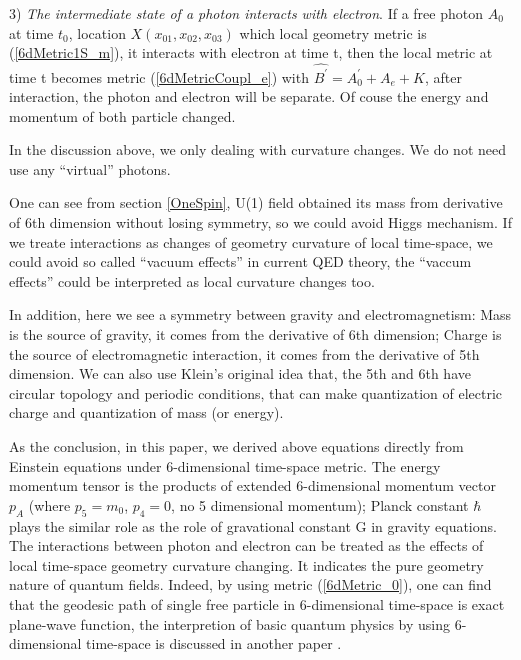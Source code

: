 \documentclass[twocolumn,showpacs,preprintnumbers,amsmath,amssymb]{revtex4}
\begin{document}
3) {\it The intermediate state of a photon interacts with electron}. If a free photon $A_0$ at time $t_0$, location $X(x_{01},x_{02},x_{03})$ which
local geometry metric is (\ref{6dMetric1S_m}), it interacts with electron at time t, then the local metric at time t becomes
metric (\ref{6dMetricCoupl_e}) with $\hat{B^{\prime}} = A^{\prime}_0 + A_{e} + \hat{K}$, after interaction, the photon and electron
will be separate. Of couse the energy and momentum of both particle changed.

In the discussion above, we only dealing with curvature changes. We do not need use any ``virtual'' photons.

One can see from section \ref{OneSpin}, U(1) field obtained its mass from derivative of 6th dimension without losing symmetry, so 
we could avoid Higgs mechanism. If we treate interactions as changes of geometry curvature of local time-space, we could 
avoid so called ``vacuum effects'' in current QED theory, the ``vaccum effects'' could be interpreted as local curvature changes too.

In addition, here we see a symmetry between gravity and electromagnetism: Mass is the source of gravity, it comes from the derivative 
of 6th dimension; Charge is the source of electromagnetic interaction, it comes from the derivative of 5th dimension.
We can also use Klein's original idea that, the 5th and 6th have circular topology and periodic conditions, that can make
quantization of electric charge and quantization of mass (or energy).

As the conclusion, in this paper, we derived above equations directly from Einstein equations under 6-dimensional time-space metric. 
The energy momentum tensor is
the products of extended 6-dimensional momentum vector $p_A$ (where $p_5 = m_0$, $p_4 = 0$, no 5 dimensional momentum);
Planck constant $\hbar$ plays the similar role as the role of gravational constant G in gravity equations. 
The interactions between photon and electron can be treated as the effects of local time-space geometry curvature changing.
It indicates the pure geometry nature of quantum fields.
Indeed, by using metric (\ref{6dMetric_0}), one can find that the geodesic path of single free
 particle in 6-dimensional time-space is exact plane-wave function, the interpretion of basic quantum physics by using
 6-dimensional time-space is discussed in another paper \cite{xchen}.
\end{document}
